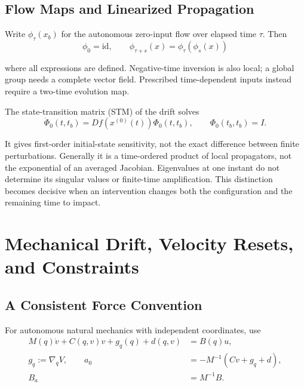 \subsection{Flow Maps and Linearized Propagation}
\label{prop:ch7:flow-properties}
Write $\phi_\tau(x_b)$ for the autonomous zero-input flow over elapsed time $\tau$. Then
\begin{equation}
\phi_0=\mathrm{id},\qquad
\phi_{\tau+s}(x)=\phi_\tau(\phi_s(x))
\label{eq:ch7:flow-map}
\end{equation}

where all expressions are defined. Negative-time inversion is also local; a global group needs a complete vector field. Prescribed time-dependent inputs instead require a two-time evolution map.

The state-transition matrix (STM) of the drift solves
\begin{equation}
\dot\Phi_0(t,t_b)=D f(x^{(0)}(t))\Phi_0(t,t_b),\qquad
\Phi_0(t_b,t_b)=I.
\label{eq:ch7:variational}
\end{equation}

It gives first-order initial-state sensitivity, not the exact difference between finite perturbations. Generally it is a time-ordered product of local propagators, not the exponential of an averaged Jacobian. Eigenvalues at one instant do not determine its singular values or finite-time amplification. This distinction becomes decisive when an intervention changes both the configuration and the remaining time to impact.

\section{Mechanical Drift, Velocity Resets, and Constraints}
\label{sec:ch7:mechanics}

\subsection{A Consistent Force Convention}
For autonomous natural mechanics with independent coordinates, use
\begin{equation}
\begin{aligned}
M(q)\dot v+C(q,v)v+g_q(q)+d(q,v)&=B(q)u,\\
g_q:=\nabla_q V,\qquad a_0&=-M^{-1}(Cv+g_q+d),\\
B_a&=M^{-1}B.
\end{aligned}
\label{eq:ch7:drift-decomposition}
\end{equation}

